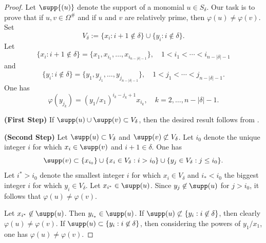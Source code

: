 \documentclass[12pt]{amsart}
\begin{document}
\begin{proof}
Let $\supp{(u)}$ denote the support of a monomial $u \in S_\delta$.  Our task is to prove that if $u,v \in \Omega^\#$ and if $u$ and $v$ are relatively prime, then $\varphi(u) \neq \varphi(v)$.  Set 
\[
V_\delta := \{x_i : i+1 \not\in \delta\} \cup \{y_i : i \not\in \delta\}.
\]
Let
\[
\{x_i : i+1 \not\in \delta\} = \{x_1, x_{i_1}, \ldots, x_{i_{n-|\delta|-1}}\}, \quad 1 < i_1 < \cdots < i_{n-|\delta|-1}
\]
and
\[
\{y_i : i \not\in \delta\} = \{y_1, y_{j_1}, \ldots, y_{j_{n-|\delta|-1}}\}, \quad 1 < j_1 < \cdots < j_{n-|\delta|-1}.
\]
One has 
\[
\varphi(y_{j_k}) = (y_1/x_1)^{i_k - j_k + 1} x_{i_k}, \quad k = 2,\ldots, n-|\delta|-1.
\]

\medskip

\noindent
{\bf (First Step)}  If $\supp(u) \cup \supp(v) \subset V_\delta$, then the desired result follows from \cite[p.~98]{Hibi}.   



\medskip

\noindent
{\bf (Second Step)}  Let $\supp(u) \subset V_\delta$ and $\supp(v) \not\subset V_\delta$.  Let $i_0$ denote the unique integer $i$ for which $x_{i} \in \supp(v)$ and $i+1 \in \delta$.  One has 
\[
\supp(v) \subset \{x_{i_0}\} \cup \{x_i \in V_\delta: i > i_0\} \cup \{y_j \in V_\delta: j \leq i_0 \} .
\]
Let $i^* > i_0$ denote the smallest integer $i$ for which $x_i \in V_\delta$ and $i_* < i_0$ the biggest integer $i$ for which $y_i \in V_\delta$.  
%
Let $x_{i^*} \in \supp(u)$.  Since $y_j \not\in \supp(u)$ for $j > i_0$, it follows that $\varphi(u) \neq \varphi(v)$. 

Let $x_{i^*} \not\in \supp(u)$.  Then $y_{i_*} \in \supp(u)$.  If $\supp(u) \not\subset \{y_i : i \not\in \delta \}$, then clearly $\varphi(u) \neq \varphi(v)$.  If $\supp(u) \subset \{y_i : i \not\in \delta \}$, then considering the powers of $y_1/x_1$, one has $\varphi(u) \neq \varphi(v)$. 


\end{proof}
\end{document}
